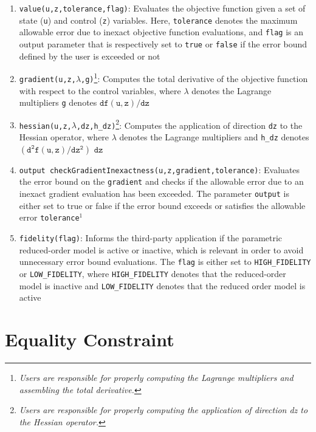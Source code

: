     \begin{enumerate}
    \item \texttt{value(u,z,tolerance,flag)}: Evaluates the objective function given a set of state (\texttt{u}) and control (\texttt{z}) variables. Here, \texttt{tolerance} denotes the maximum allowable error due to inexact objective function evaluations, and \texttt{flag} is an output parameter that is respectively set to \texttt{true} or \texttt{false} if the error bound defined by the user is exceeded or not
    \item \texttt{gradient(u,z,$\mathtt{\lambda}$,g)}\footnote{\emph{Users are responsible for properly computing the Lagrange multipliers and assembling the total derivative.}}: Computes the total derivative of the objective function with respect to the control variables, where $\mathtt{\lambda}$ denotes the Lagrange multipliers \texttt{g} denotes $\mathtt{d{f}(u,z)/d{z}}$
     \item \texttt{hessian(u,z,$\mathtt{\lambda}$,dz,h\_dz)}\footnote{\emph{Users are responsible for properly computing the application of direction dz to the Hessian operator.}}: Computes the application of direction \texttt{dz} to the Hessian operator, where $\mathtt{\lambda}$ denotes the Lagrange multipliers and \texttt{h\_dz} denotes $\mathtt{(d^2{f}(u,z)/d{z}^2)}$ $\mathtt{dz}$ 
    \item \texttt{output checkGradientInexactness(u,z,gradient,tolerance)}: Evaluates the error bound on the \texttt{gradient} and checks if the allowable error due to an inexact gradient evaluation has been exceeded. The parameter \texttt{output} is either set to true or false if the error bound exceeds or satisfies the allowable error \texttt{tolerance}$^1$
    \item \texttt{fidelity(flag)}: Informs the third-party application if the parametric reduced-order model is active or inactive, which is relevant in order to avoid unnecessary error bound evaluations. The \texttt{flag} is either set to \texttt{HIGH\_FIDELITY} or \texttt{LOW\_FIDELITY}, where \texttt{HIGH\_FIDELITY} denotes that the reduced-order model is inactive and \texttt{LOW\_FIDELITY} denotes that the reduced order model is active
    \end{enumerate}
    
    \section{Equality Constraint}\label{sec:EqualityAPI}
    
